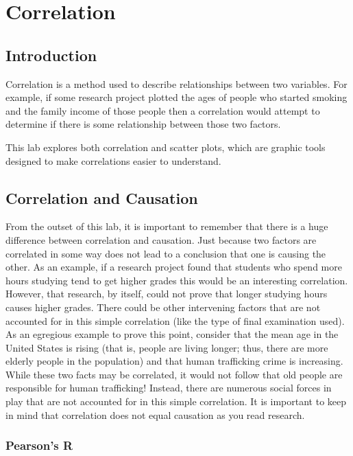 \chapter{Correlation}\label{cor:correlation}

\section{Introduction}

Correlation is a method used to describe relationships between two variables. For example, if some research project plotted the ages of people who started smoking and the family income of those people then a correlation would attempt to determine if there is some relationship between those two factors.

This lab explores both correlation and scatter plots, which are graphic tools designed to make correlations easier to understand. 

\section{Correlation and Causation}

From the outset of this lab, it is important to remember that there is a huge difference between correlation and causation. Just because two factors are correlated in some way does not lead to a conclusion that one is causing the other. As an example, if a research project found that students who spend more hours studying tend to get higher grades this would be an interesting correlation. However, that research, by itself, could not prove that longer studying hours causes higher grades. There could be other intervening factors that are not accounted for in this simple correlation (like the type of final examination used). As an egregious example to prove this point, consider that the mean age in the United States is rising (that is, people are living longer; thus, there are more elderly people in the population) and that human trafficking crime is increasing. While these two facts may be correlated, it would not follow that old people are responsible for human trafficking! Instead, there are numerous social forces in play that are not accounted for in this simple correlation. It is important to keep in mind that correlation does not equal causation as you read research.

\subsection{Pearson's R}\label{cor:pearsons_r}

